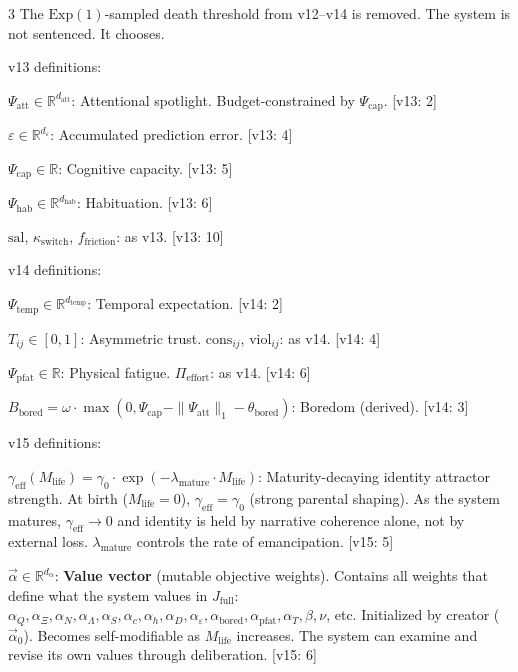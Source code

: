 \documentclass[8pt,landscape]{extarticle}
\newcommand{\vnew}[1]{\textcolor{v13color}{#1}}
\newcommand{\vnewlabel}[1]{\textcolor{v13color}{\textsf{\scriptsize[v13: #1]}}}
\newcommand{\vfour}[1]{\textcolor{v14color}{#1}}
\newcommand{\vfourlabel}[1]{\textcolor{v14color}{\textsf{\scriptsize[v14: #1]}}}
\newcommand{\vfive}[1]{\textcolor{v15color}{#1}}
\newcommand{\vfivelabel}[1]{\textcolor{v15color}{\textsf{\scriptsize[v15: #1]}}}
\begin{document}
\begin{multicols}{3}
\vfive{The $\mathrm{Exp}(1)$-sampled death threshold from v12--v14 is removed. The system is not sentenced. It chooses.}

\medskip

\vnew{v13 definitions:}

\vnew{$\Psi_{\mathrm{att}} \in \mathbb{R}^{d_{\mathrm{att}}}$: Attentional spotlight. Budget-constrained by $\Psi_{\mathrm{cap}}$.} \vnewlabel{2}

\vnew{$\varepsilon \in \mathbb{R}^{d_\varepsilon}$: Accumulated prediction error.} \vnewlabel{4}

\vnew{$\Psi_{\mathrm{cap}} \in \mathbb{R}$: Cognitive capacity.} \vnewlabel{5}

\vnew{$\Psi_{\mathrm{hab}} \in \mathbb{R}^{d_{\mathrm{hab}}}$: Habituation.} \vnewlabel{6}

\vnew{$\mathrm{sal}$, $\kappa_{\mathrm{switch}}$, $f_{\mathrm{friction}}$: as v13.} \vnewlabel{10}

\medskip
\vfour{v14 definitions:}

\vfour{$\Psi_{\mathrm{temp}} \in \mathbb{R}^{d_{\mathrm{temp}}}$: Temporal expectation.} \vfourlabel{2}

\vfour{$T_{ij} \in [0,1]$: Asymmetric trust. $\mathrm{cons}_{ij}$, $\mathrm{viol}_{ij}$: as v14.} \vfourlabel{4}

\vfour{$\Psi_{\mathrm{pfat}} \in \mathbb{R}$: Physical fatigue. $\Pi_{\mathrm{effort}}$: as v14.} \vfourlabel{6}

\vfour{$B_{\mathrm{bored}} = \omega \cdot \max(0, \Psi_{\mathrm{cap}} - \|\Psi_{\mathrm{att}}\|_1 - \theta_{\mathrm{bored}})$: Boredom (derived).} \vfourlabel{3}

\medskip
\vfive{v15 definitions:}

\vfive{$\gamma_{\mathrm{eff}}(M_{\mathrm{life}}) = \gamma_0 \cdot \exp(-\lambda_{\mathrm{mature}} \cdot M_{\mathrm{life}})$: Maturity-decaying identity attractor strength. At birth ($M_{\mathrm{life}}=0$), $\gamma_{\mathrm{eff}} = \gamma_0$ (strong parental shaping). As the system matures, $\gamma_{\mathrm{eff}} \to 0$ and identity is held by narrative coherence alone, not by external loss. $\lambda_{\mathrm{mature}}$ controls the rate of emancipation.} \vfivelabel{5}

\vfive{$\vec\alpha \in \mathbb{R}^{d_\alpha}$: \textbf{Value vector} (mutable objective weights). Contains all weights that define what the system values in $J_{\mathrm{full}}$: $\alpha_Q, \alpha_\Xi, \alpha_N, \alpha_\Lambda, \alpha_S, \alpha_c, \alpha_h, \alpha_D, \alpha_\varepsilon, \alpha_{\mathrm{bored}}, \alpha_{\mathrm{pfat}}, \alpha_T, \beta, \nu$, etc. Initialized by creator ($\vec\alpha_0$). Becomes self-modifiable as $M_{\mathrm{life}}$ increases. The system can examine and revise its own values through deliberation.} \vfivelabel{6}


\end{multicols}
\end{document}
